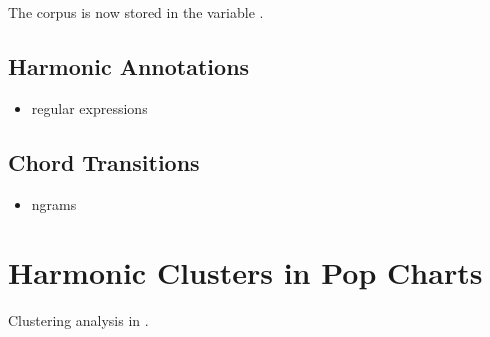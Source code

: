 \documentclass[letterpaper,10pt,english]{sphinxmanual}
\begin{document}
\begin{sphinxVerbatim}[commandchars=\\\{\}]
   

   
\end{sphinxVerbatim}

The corpus is now stored in the variable .


\section{Harmonic Annotations}
\label{\detokenize{beethoven_harmony:harmonic-annotations}}\begin{itemize}
\item {} 
regular expressions

\end{itemize}



\section{Chord Transitions}
\label{\detokenize{beethoven_harmony:chord-transitions}}\begin{itemize}
\item {} 
n\sphinxhyphen{}grams

\end{itemize}


\chapter{Harmonic Clusters in Pop Charts}
\label{\detokenize{billboard:harmonic-clusters-in-pop-charts}}\label{\detokenize{billboard::doc}}

Clustering analysis in .

\begin{sphinxVerbatim}[commandchars=\\\{\}]
    
           
    
\end{sphinxVerbatim}
\end{document}
